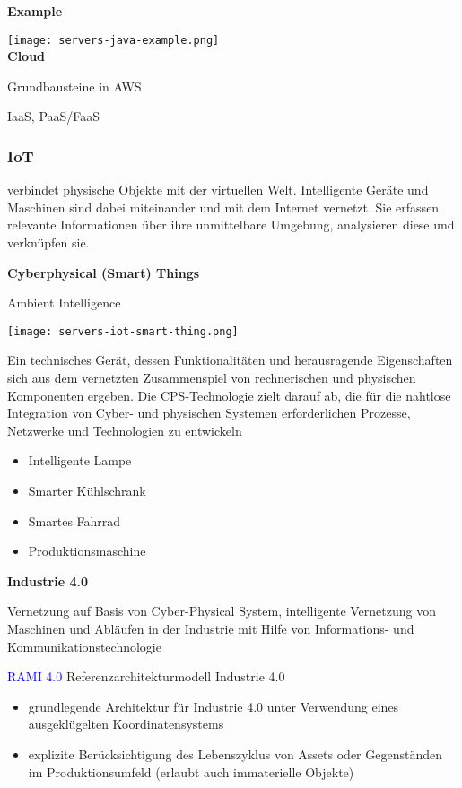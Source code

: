\textbf{Example}

\texttt{[image: servers-java-example.png]} \\

\textbf{Cloud}

Grundbausteine in AWS

IaaS, PaaS/FaaS

\subsubsection{IoT}
verbindet physische Objekte mit der virtuellen Welt. Intelligente Geräte und Maschinen sind dabei miteinander und mit dem Internet vernetzt. Sie erfassen relevante Informationen über ihre unmittelbare Umgebung, analysieren diese und verknüpfen sie.

\textbf{Cyberphysical (Smart) Things}

Ambient Intelligence

\texttt{[image: servers-iot-smart-thing.png]}

Ein technisches Gerät, dessen Funktionalitäten und herausragende Eigenschaften sich aus dem vernetzten Zusammenspiel von rechnerischen und physischen Komponenten ergeben. Die CPS-Technologie zielt darauf ab, die für die nahtlose Integration von Cyber- und physischen Systemen erforderlichen Prozesse, Netzwerke und Technologien zu entwickeln

\begin{itemize}
    \item Intelligente Lampe
    \item Smarter Kühlschrank
    \item Smartes Fahrrad
    \item Produktionsmaschine
\end{itemize}
\vspace{10pt}
\textbf{Industrie 4.0}

Vernetzung auf Basis von Cyber-Physical System, intelligente Vernetzung von Maschinen und Abläufen in der Industrie mit Hilfe von Informations- und Kommunikationstechnologie

\textcolor{blue}{RAMI 4.0}
Referenzarchitekturmodell Industrie 4.0

\begin{itemize}
    \item grundlegende Architektur für Industrie 4.0 unter Verwendung eines ausgeklügelten Koordinatensystems
    \item explizite Berücksichtigung des Lebenszyklus von Assets oder Gegenständen im Produktionsumfeld (erlaubt auch immaterielle Objekte)
\end{itemize}

